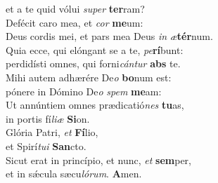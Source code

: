 \evenverse et a te quid vólui \textit{su}\textit{per} \textbf{ter}ram?\\
\oddverse Defécit caro mea, et \textit{cor} \textbf{me}um:~\*\\
\oddverse Deus cordis mei, et pars mea Deus \textit{in} \textit{æ}\textbf{tér}num.\\
\evenverse Quia ecce, qui elóngant se a te, \textit{pe}\textbf{rí}bunt:~\*\\
\evenverse perdidísti omnes, qui forni\textit{cán}\textit{tur} \textbf{abs} te.\\
\oddverse Mihi autem adhærére De\textit{o} \textbf{bo}num est:~\*\\
\oddverse pónere in Dómino De\textit{o} \textit{spem} \textbf{me}am:\\
\evenverse Ut annúntiem omnes prædicatió\textit{nes} \textbf{tu}as,~\*\\
\evenverse in portis fí\textit{li}\textit{æ} \textbf{Si}on.\\
\oddverse Glória Patri, \textit{et} \textbf{Fí}lio,~\*\\
\oddverse et Spirí\textit{tu}\textit{i} \textbf{San}cto.\\
\evenverse Sicut erat in princípio, et nunc, \textit{et} \textbf{sem}per,~\*\\
\evenverse et in sǽcula sæcu\textit{ló}\textit{rum}. \textbf{A}men.\\
